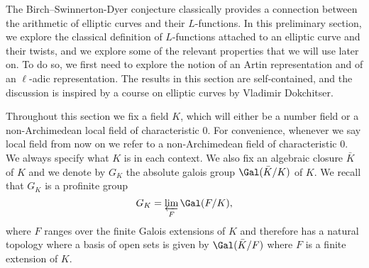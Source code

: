 The Birch--Swinnerton-Dyer conjecture classically provides a connection between the arithmetic of elliptic curves and their $L$-functions. In this preliminary section, we explore the classical definition of $L$-functions attached to an elliptic curve and their twists, and we explore some of the relevant properties that we will use later on. To do so, we first need to explore the notion of an Artin representation and of an $\ell$-adic representation. The results in this section are self-contained, and the discussion is inspired by a course on elliptic curves by Vladimir Dokchitser.

Throughout this section we fix a field $K$, which will either be a number field or a non-Archimedean local field of characteristic $0$. For convenience, whenever we say local field from now on we refer to a non-Archimedean field of characteristic $0$. We always specify what $K$ is in each context. We also fix an algebraic closure $\bar{K}$ of $K$ and we denote by $G_K$ the absolute galois group $\Gal(\bar{K}/K)$ of $K$. We recall that $G_K$ is a profinite group
$$G_K=\varprojlim_{F}\Gal(F/K),$$
where $F$ ranges over the finite Galois extensions of $K$ and therefore has a natural topology where a basis of open sets is given by $\Gal(\bar{K}/F)$ where $F$ is a finite extension of $K$.




